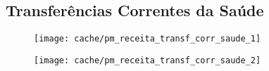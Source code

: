 
\subsection{Transferências Correntes da Saúde}





\begin{figure}[H]
\center
\texttt{[image: cache/pm\_receita\_transf\_corr\_saude\_1]}
\end{figure}

\begin{figure}[H]
\center
\texttt{[image: cache/pm\_receita\_transf\_corr\_saude\_2]}
\end{figure}
